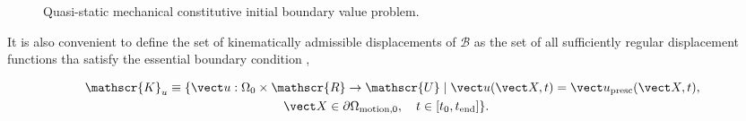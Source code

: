 \begin{figure}
  \caption{Quasi-static mechanical constitutive initial boundary value problem.}
\label{fig:quasi_static_prob}
\end{figure}

It is also convenient to define the set of kinematically admissible displacements of $\mathscr{B}$ as the set of all sufficiently regular displacement functions tha satisfy the essential boundary condition \citep{de_souza_neto_computational_2008},
\begin{highlight}[innertopmargin=-5pt]
    \begin{multline}
        \mathscr{K}_u\equiv \{\vect u:\Omega_0\times \mathscr{R}\to \mathscr{U}\;|\;\vect u(\vect X,t) = \vect u_\text{presc} (\vect X,t),\\ \vect X\in\partial \Omega_\text{motion,0},\quad t\in [t_0,t_\text{end}]\}.\quad
    \end{multline}
\end{highlight}


